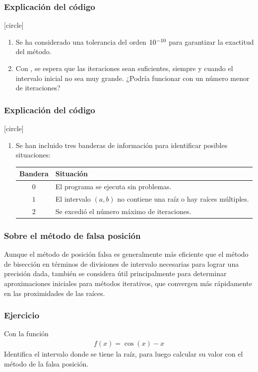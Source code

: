 \begin{frame}
\frametitle{Explicación del código}
[circle]
\begin{enumerate}[<+->]
\item Se ha considerado una tolerancia del orden $\num{d-10}$ para garantizar la exactitud del método.
\item Con , se espera que las iteraciones sean suficientes, siempre y cuando el intervalo inicial no sea muy grande. ¿Podría funcionar con un número menor de iteraciones?
\seti
\end{enumerate}
\end{frame}
\begin{frame}
\frametitle{Explicación del código}
[circle]
\begin{enumerate}[<+->]
\conti
\item Se han incluido tres banderas de información para identificar posibles situaciones:
\begin{table}
\begin{tabular}{c p{8cm}}
Bandera & Situación \\ \hline
$0$ & El programa se ejecuta sin problemas. \\ \hline
$1$ & El intervalo $(a, b)$ no contiene una raíz o hay raíces múltiples. \\ \hline
$2$ & Se excedió el número máximo de iteraciones. \\ \hline
\end{tabular}
\end{table}
\seti
\end{enumerate}
\end{frame}
\begin{frame}
\frametitle{Sobre el método de falsa posición}
Aunque el método de posición falsa es generalmente más eficiente que el método de bisección en términos de divisiones de intervalo necesarias para lograr una precisión dada, también se considera útil principalmente para determinar aproximaciones iniciales para métodos iterativos, que convergen más rápidamente en las proximidades de las raíces.
\end{frame}
\begin{frame}
\frametitle{Ejercicio}
Con la función
\begin{align*}
f(x) = \cos (x) - x
\end{align*}
Identifica el intervalo donde se tiene la raíz, para luego calcular su valor con el método de la falsa posición.
\end{frame}
